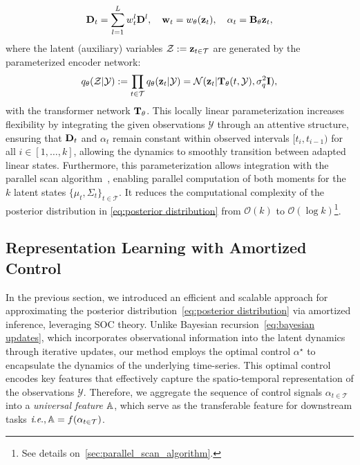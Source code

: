 \[\label{eq:drift approximation}
    \mathbf{D}_t = \sum_{l=1}^L w_t^l \mathbf{D}^l, \quad \mathbf{w}_t = w_{\theta}(\mathbf{z}_t), \quad \alpha_t = \mathbf{B}_{\theta}\mathbf{z}_t,
\]
where the latent (auxiliary) variables $\mathcal{Z} := \mathbf{z}_{t \in \mathcal{T}}$ are generated by the parameterized encoder network: 
\[\label{eq:encoder network}
     q_{\theta}(\mathcal{Z} | \mathcal{Y}) : = \prod_{t \in \mathcal{T}} q_{\theta}(\mathbf{z}_t | \mathcal{Y}) = \mathcal{N}(\mathbf{z}_t | \mathbf{T}_{\theta}(t, \mathcal{Y}), \sigma^2_q \mathbf{I}),
\]
with the transformer network $\mathbf{T}_{\theta}$. This locally linear parameterization increases flexibility by integrating the given observations $\mathcal{Y}$ through an attentive structure, ensuring that $\mathbf{D}_t$ and $\alpha_t$ remain constant within observed intervals $[t_i, t_{i-1})$ for all $i \in [1, \dots, k]$, allowing the dynamics to smoothly transition between adapted linear states. Furthermore, this parameterization allows integration with the parallel scan algorithm~\citep{blelloch1990prefix}, enabling parallel computation of both moments for the $k$ latent states $\{\mu_{t}, \Sigma_{t}\}_{t \in \mathcal{T}}$. It reduces the computational complexity of the posterior distribution in \eqref{eq:posterior distribution} from $\mathcal{O}(k)$ to $\mathcal{O}(\log k)$\footnote{See details on~\cref{sec:parallel_scan_algorithm}.}.


\subsection{Representation Learning with Amortized Control} \label{sec:main:method:subsection:universal features}

In the previous section, we introduced an efficient and scalable approach for approximating the posterior distribution~\eqref{eq:posterior distribution} via amortized inference, leveraging SOC theory. Unlike Bayesian recursion~\eqref{eq:bayesian updates}, which incorporates observational information into the latent dynamics through iterative updates, our method employs the optimal control $\alpha^{\star}$ to encapsulate the dynamics of the underlying time-series. This optimal control encodes key features that effectively capture the spatio-temporal representation of the observations $\mathcal{Y}$.
Therefore, we aggregate the sequence of control signals $\alpha_{t  \in \mathcal{T}}$ into a \textit{universal feature} $\mathbb{A}$, which serve as the transferable feature for downstream tasks $\textit{i}.\textit{e}., \mathbb{A} = f(\alpha_{t  \in \mathcal{T}})$. 

